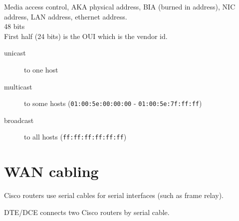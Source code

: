 \documentclass{article}
\begin{document}
Media access control, AKA physical address, BIA (burned in address), NIC
address, LAN address, ethernet address.\\

48 bits\\

First half (24 bits) is the OUI which is the vendor id.

\begin {description}

\item[unicast]
to one host

\item[multicast]
to some hosts (\texttt{01:00:5e:00:00:00} - \texttt{01:00:5e:7f:ff:ff})

\item[broadcast]
to all hosts (\texttt{ff:ff:ff:ff:ff:ff})

\end{description}

\section{WAN cabling}

Cisco routers use serial cables for serial interfaces (such as frame relay).

DTE/DCE connects two Cisco routers by serial cable.
\end{document}
